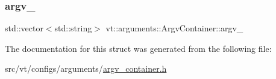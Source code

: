 \subsubsection{\texorpdfstring{argv\+\_\+}{argv\_}}
{\footnotesize\ttfamily std\+::vector$<$std\+::string$>$ vt\+::arguments\+::\+Argv\+Container\+::argv\+\_\+\hspace{0.3cm}{\ttfamily [private]}}



The documentation for this struct was generated from the following file\+:\begin{DoxyCompactItemize}
\item 
src/vt/configs/arguments/\hyperlink{argv__container_8h}{argv\+\_\+container.\+h}\end{DoxyCompactItemize}
